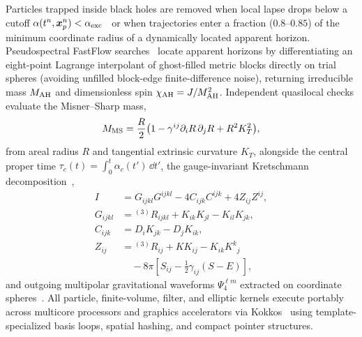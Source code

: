 Particles trapped inside black holes are removed when local lapse drops below a cutoff $\alpha(t^n, \bm{x}_p^n) < \alpha_{\rm exc}$~\cite{Rosswog:2023nnl,Wu:2026nrpic} or when trajectories enter a fraction ($0.8\text{--}0.85$) of the minimum coordinate radius of a dynamically located apparent horizon. Pseudospectral FastFlow searches~\cite{Gundlach:1997us,Zhu:2024utz} locate apparent horizons by differentiating an eight-point Lagrange interpolant of ghost-filled metric blocks directly on trial spheres (avoiding unfilled block-edge finite-difference noise), returning irreducible mass $M_{\rm AH}$ and dimensionless spin $\chi_{\rm AH} = J / M_{\rm AH}^2$. Independent quasilocal checks evaluate the Misner--Sharp mass,
\begin{equation}\label{eq:misner_sharp}
M_{\rm MS} = \frac{R}{2}\bigl(1 - \gamma^{ij}\partial_i R\,\partial_j R + R^2 K_T^2\bigr),
\end{equation}
from areal radius $R$ and tangential extrinsic curvature $K_T$, alongside the central proper time $\tau_c(t) = \int_0^t \alpha_c(t')\,\dd t'$, the gauge-invariant Kretschmann decomposition~\cite{Wu:2026nrpic},
\begin{align}\label{eq:kretschmann}
I &= G_{ijkl}G^{ijkl} - 4 C_{ijk}C^{ijk} + 4 Z_{ij}Z^{ij}, \nonumber\\
G_{ijkl} &= {}^{(3)}R_{ijkl} + K_{ik}K_{jl} - K_{il}K_{jk}, \nonumber\\
C_{ijk} &= D_i K_{jk} - D_j K_{ik}, \nonumber\\
Z_{ij} &= {}^{(3)}R_{ij} + K K_{ij} - K_{ik}K^k{}_j \nonumber\\
&\quad - 8\pi\left[S_{ij} - \frac{1}{2}\gamma_{ij}(S - E)\right],
\end{align}
and outgoing multipolar gravitational waveforms $\Psi_4^{\ell m}$ extracted on coordinate spheres~\cite{Bishop:2016lgv}. All particle, finite-volume, filter, and elliptic kernels execute portably across multicore processors and graphics accelerators via Kokkos~\cite{2022ITPDS..33..805T,2026ApJS..283...27S} using template-specialized basis loops, spatial hashing, and compact pointer structures.
